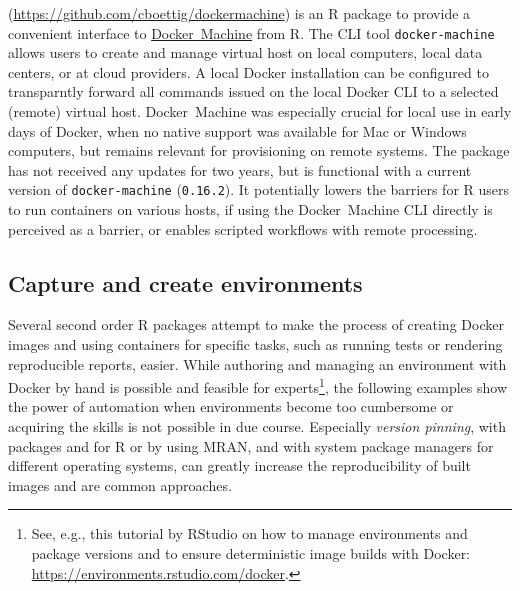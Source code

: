 \textbf{}
(\url{https://github.com/cboettig/dockermachine}) is an R package to
provide a convenient interface to
\href{https://docs.docker.com/machine/overview/}{Docker~Machine} from R.
The CLI tool \texttt{docker-machine} allows users to create and manage
virtual host on local computers, local data centers, or at cloud
providers. A local Docker installation can be configured to transparntly
forward all commands issued on the local Docker CLI to a selected
(remote) virtual host. Docker~Machine was especially crucial for local
use in early days of Docker, when no native support was available for
Mac or Windows computers, but remains relevant for provisioning on
remote systems. The package has not received any updates for two years,
but is functional with a current version of \texttt{docker-machine}
(\texttt{0.16.2}). It potentially lowers the barriers for R users to run
containers on various hosts, if using the Docker~Machine CLI directly is
perceived as a barrier, or enables scripted workflows with remote
processing.

\hypertarget{capture-and-create-environments}{%
\subsection{Capture and create
environments}\label{capture-and-create-environments}}

\label{envs}

Several second order R packages attempt to make the process of creating
Docker images and using containers for specific tasks, such as running
tests or rendering reproducible reports, easier. While authoring and
managing an environment with Docker by hand is possible and feasible for
experts\footnote{See, e.g., this tutorial by RStudio on how to manage environments and package versions and to ensure deterministic image builds with Docker: \href{https://environments.rstudio.com/docker}{https://environments.rstudio.com/docker}.},
the following examples show the power of automation when environments
become too cumbersome or acquiring the skills is not possible in due
course. Especially \emph{version pinning}, with packages 
and  for R or by using MRAN, and with system package
managers for different operating systems, can greatly increase the
reproducibility of built images and are common approaches.

